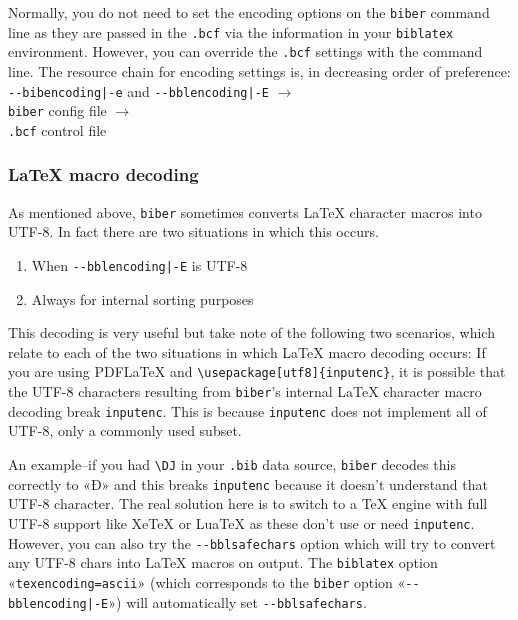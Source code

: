 \documentclass{ltxdockit}
\begin{document}
\noindent Normally, you do not need to set the encoding options on the
\verb+biber+ command line as they are passed in the \verb+.bcf+ via the
information in your \verb+biblatex+ environment. However, you can override
the \verb+.bcf+ settings with the command line. The resource chain for
encoding settings is, in decreasing order
of preference:\\[2ex]

\noindent\verb+--bibencoding|-e+ and \verb+--bblencoding|-E+ $\rightarrow$\\
\hspace*{1em}\verb+biber+ config file $\rightarrow$\\
\hspace*{2em}\verb+.bcf+ control file

\subsubsection{LaTeX macro decoding}

\noindent As mentioned above, \verb+biber+ sometimes converts LaTeX
character macros into UTF-8. In fact there are two situations in which
this occurs.

\begin{enumerate}
\item When \verb+--bblencoding|-E+ is UTF-8
\item Always for internal sorting purposes
\end{enumerate}

\noindent This decoding is very useful but take note of the following
two scenarios, which relate to each of the two situations in which
LaTeX macro decoding occurs:
\bigskip
{}
If you are using PDFLaTeX and \verb+\usepackage[utf8]{inputenc}+, it
is possible that the UTF-8 characters resulting from \verb+biber+'s
internal LaTeX character macro decoding break \verb+inputenc+. This is
because \verb+inputenc+ does not implement all of UTF-8, only a
commonly used subset.

An example--if you had \verb+\DJ+ in your \verb+.bib+ data source,
\verb+biber+ decodes this correctly to «Đ» and this breaks \verb+inputenc+
because it doesn't understand that UTF-8 character. The real solution here
is to switch to a TeX engine with full UTF-8 support like XeTeX or LuaTeX
as these don't use or need \verb+inputenc+. However, you can also try the
\verb+--bblsafechars+ option which will try to convert any UTF-8 chars into
LaTeX macros on output. The \verb+biblatex+ option
«\verb+texencoding=ascii+» (which corresponds to the \verb+biber+ option
«\verb+--bblencoding|-E+») will automatically set \verb+--bblsafechars+.
\end{document}
